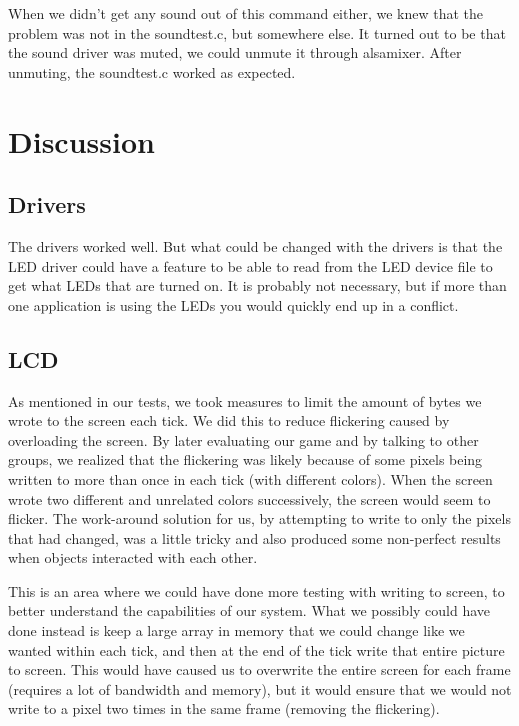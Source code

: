 \documentclass[12pt,a4paper,final]{report}
\numberwithin{equation}{section}
\numberwithin{table}{section}
\numberwithin{figure}{section}
\begin{document}
When we didn’t get any sound out of this command either, we knew that the problem was not in the soundtest.c, but somewhere else. It turned out to be that the sound driver was muted, we could unmute it through alsamixer. After unmuting, the soundtest.c worked as expected.

\newpage

\section{Discussion}
\label{sec:discussion}

\subsection{Drivers}
\label{sec:drivers}
The drivers worked well. But what could be changed with the drivers is that the LED driver could have a feature to be able to read from the LED device file to get what LEDs that are turned on. It is probably not necessary, but if more than one application is using the LEDs you would quickly end up in a conflict.

\subsection{LCD}
\label{sec:lcd2}
As mentioned in our tests, we took measures to limit the amount of bytes we wrote to the screen each tick. We did this to reduce flickering caused by overloading the screen. By later evaluating our game and by talking to other groups, we realized that the flickering was likely because of some pixels being written to more than once in each tick (with different colors). When the screen wrote two different and unrelated colors successively, the screen would seem to flicker. The work-around solution for us, by attempting to write to only the pixels that had changed, was a little tricky and also produced some non-perfect results when objects interacted with each other.

This is an area where we could have done more testing with writing to screen, to better understand the capabilities of our system. What we possibly could have done instead is keep a large array in memory that we could change like we wanted within each tick, and then at the end of the tick write that entire picture to screen. This would have caused us to overwrite the entire screen for each frame (requires a lot of bandwidth and memory), but it would ensure that we would not write to a pixel two times in the same frame (removing the flickering). 
\end{document}
